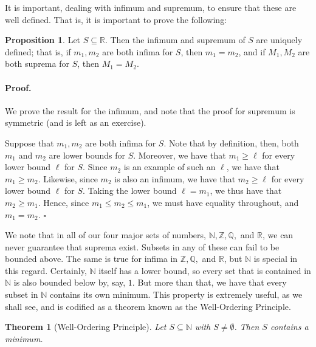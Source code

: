 \documentclass{article}
\newtheorem{theorem}{Theorem}
\theoremstyle{definition}
\newtheorem{prop}{Proposition}
\renewenvironment{proof} {\paragraph{Proof.}}{\hfill$\square$}
\newcommand{\Z}{\mathbb{Z}}
\newcommand{\N}{\mathbb{N}}
\newcommand{\Q}{\mathbb{Q}}
\newcommand{\R}{\mathbb{R}}
\begin{document}
It is important, dealing with infimum and supremum, to ensure that these are well defined. That is, it is important to prove the following:

\begin{prop}
Let $S\subseteq \R$. Then the infimum and supremum of $S$ are uniquely defined; that is, if $m_1, m_2$ are both infima for $S$, then $m_1=m_2$, and if $M_1, M_2$ are both suprema for $S$, then $M_1=M_2$.
\end{prop}

\begin{proof}
We prove the result for the infimum, and note that the proof for supremum is symmetric (and is left as an exercise).

Suppose that $m_1, m_2$ are both infima for $S$. Note that by definition, then, both $m_1$ and $m_2$ are lower bounds for $S$. Moreover, we have that $m_1\geq \ell$ for every lower bound $\ell$ for $S$. Since $m_2$ is an example of such an $\ell$, we have that $m_1\geq m_2$. Likewise, since $m_2$ is also an infimum, we have that $m_2\geq \ell$ for every lower bound $\ell$ for $S$. Taking the lower bound $\ell=m_1$, we thus have that $m_2\geq m_1$. Hence, since $m_1\leq m_2\leq m_1$, we must have equality throughout, and $m_1=m_2$.
\end{proof}

We note that in all of our four major sets of numbers, $\N, \Z, \Q, $ and $\R$, we can never guarantee that suprema exist. Subsets in any of these can fail to be bounded above. The same is true for infima in $\Z, \Q, $ and $\R$, but $\N$ is special in this regard. Certainly, $\N$ itself has a lower bound, so every set that is contained in $\N$ is also bounded below by, say, $1$. But more than that, we have that every subset in $\N$ contains its own minimum. This property is extremely useful, as we shall see, and is codified as a theorem known as the Well-Ordering Principle.

\begin{theorem}[Well-Ordering Principle]
Let $S\subseteq \N$ with $S\neq \emptyset$. Then $S$ contains a minimum.
\end{theorem}
\end{document}
